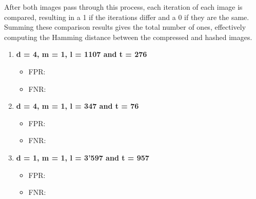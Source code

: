 After both images pass through this process, each iteration of each image is compared, resulting in a 1 if the iterations differ and a 0 if they are the same. Summing these comparison results gives the total number of ones, effectively computing the Hamming distance between the compressed and hashed images.

\begin{enumerate}
    \item \textbf{d = 4, m = 1, l = 1107 and t = 276}
        \begin{itemize}
            \item FPR: 
            \item FNR: 
        \end{itemize}
    \item \textbf{d = 4, m = 1, l = 347 and t = 76}
        \begin{itemize}
            \item FPR: 
            \item FNR: 
        \end{itemize}
    \item \textbf{d = 1, m = 1, l = 3'597 and t = 957}
        \begin{itemize}
            \item FPR: 
            \item FNR: 
        \end{itemize}
\end{enumerate}
